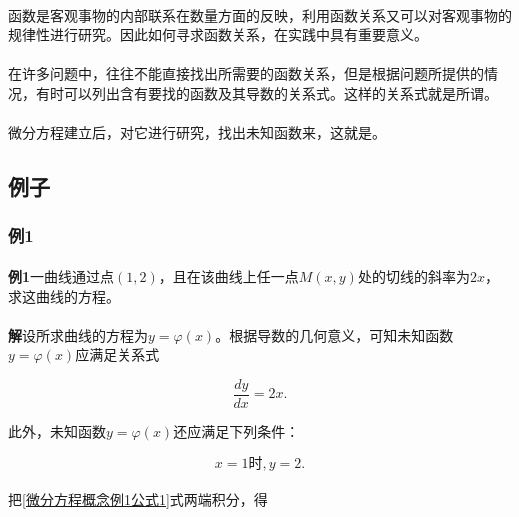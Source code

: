 \paragraph{}
函数是客观事物的内部联系在数量方面的反映，利用函数关系又可以对客观事物的规律性进行研究。因此如何寻求函数关系，在实践中具有重要意义。

\paragraph{}
在许多问题中，往往不能直接找出所需要的函数关系，但是根据问题所提供的情况，有时可以列出含有要找的函数及其导数的关系式。这样的关系式就是所谓。

\paragraph{}
微分方程建立后，对它进行研究，找出未知函数来，这就是。

\subsection{例子}
\subsubsection{例1}
\paragraph{}
\textbf{例1\;}一曲线通过点$(1,2)$，且在该曲线上任一点$M(x,y)$处的切线的斜率为$2x$，求这曲线的方程。

\paragraph{}
\textbf{解\;}设所求曲线的方程为$y=\varphi(x)$。根据导数的几何意义，可知未知函数$y=\varphi(x)$应满足关系式

\begin{equation}
  \label{微分方程概念例1公式1}
  \frac{dy}{dx} = 2x.
\end{equation}

此外，未知函数$y=\varphi(x)$还应满足下列条件：

\begin{equation}
  \label{微分方程概念例1公式2}
  x = 1 \text{时}, y = 2.
\end{equation}

\paragraph{}
把\eqref{微分方程概念例1公式1}式两端积分，得

